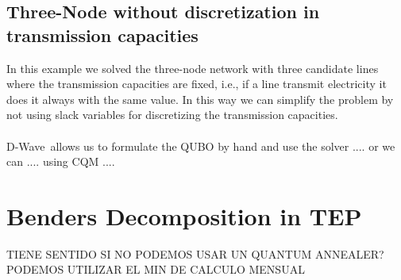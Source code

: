 \subsection{Three-Node without discretization in transmission capacities}
In this example we solved the three-node network with three candidate lines where the transmission capacities are fixed, i.e., if a line transmit electricity it does it always with the same value. In this way we can simplify the problem by not using slack variables for discretizing the transmission capacities.\\\\
D-Wave\,\cite{D-WaveDocumentation} allows us to formulate the QUBO by hand and use the  solver .... or we can .... using CQM ....
\section{Benders Decomposition in TEP}
TIENE SENTIDO SI NO PODEMOS USAR UN QUANTUM ANNEALER? PODEMOS UTILIZAR EL MIN DE CALCULO MENSUAL

